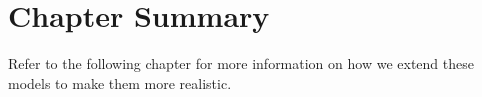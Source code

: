 \section{Chapter Summary}
Refer to the following chapter for more information on how we extend these models to make them more realistic.

%
%
%
%
%
%
%
%
% 
%
%
%
%
%
%
%
